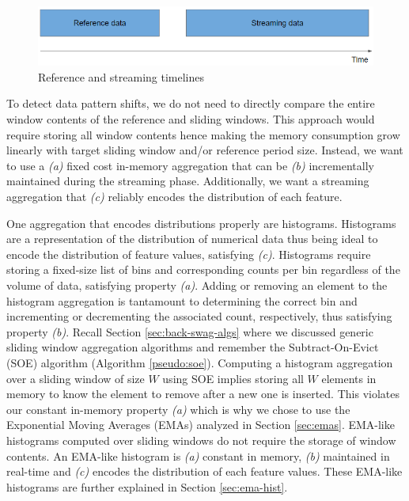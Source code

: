 \begin{figure}[!htb]
    \begin{center}
      \includegraphics[scale=0.7]{figures/timeperiods.png}
      \caption[]{Reference and streaming timelines}
      \label{fig:timelines}
    \end{center}
\end{figure}


To detect data pattern shifts, we do not need to directly compare the entire window contents of the reference and sliding windows. This approach would require storing all window contents hence making the memory consumption grow linearly with target sliding window and/or reference period size. Instead, we want to use a \textit{(a)} fixed cost in-memory aggregation that can be \textit{(b)} incrementally maintained during the streaming phase. Additionally, we want a streaming aggregation that \textit{(c)} reliably encodes the distribution of each feature. 

One aggregation that encodes distributions properly are histograms. Histograms are a representation of the distribution of numerical data thus being ideal to encode the distribution of feature values, satisfying \textit{(c)}. Histograms require storing a fixed-size list of bins and corresponding counts per bin regardless of the volume of data, satisfying property \textit{(a)}. Adding or removing an element to the histogram aggregation is tantamount to determining the correct bin and incrementing or decrementing the associated count, respectively, thus satisfying property \textit{(b)}. Recall Section \ref{sec:back-swag-algs} where we discussed generic sliding window aggregation algorithms and remember the Subtract-On-Evict (SOE) algorithm (Algorithm \ref{pseudo:soe}). Computing a histogram aggregation over a sliding window of size $W$ using SOE implies storing all $W$ elements in memory to know the element to remove after a new one is inserted. This violates our constant in-memory property \textit{(a)} which is why we chose to use the Exponential Moving Averages (EMAs) analyzed in Section \ref{sec:emas}. EMA-like histograms computed over sliding windows do not require the storage of window contents. An EMA-like histogram is \textit{(a)} constant in memory, \textit{(b)} maintained in real-time and \textit{(c)} encodes the distribution of each feature values. These EMA-like histograms are further explained in Section \ref{sec:ema-hist}.

